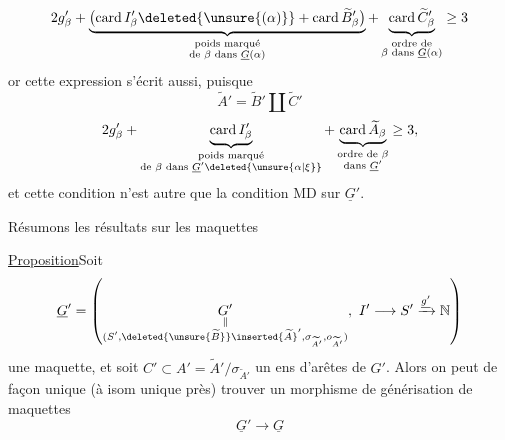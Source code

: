 \[
2g'_\beta+\underbrace{\bigl(\operatorname{card}I'_\beta\deleted{\unsure{(\alpha)}}+\operatorname{card}\widetilde B'_\beta\bigr)}_{\substack{\text{poids marqué}\\\text{de }\beta\text{ dans }\underline G(\alpha)}}+\underbrace{\operatorname{card}\widetilde C'_\beta}_{\substack{\text{ordre de}\\\beta\text{ dans }\underline G(\alpha)}}\geq3
\]
or cette expression s'écrit aussi, puisque
\[
\widetilde A'=\widetilde B'\amalg\widetilde C'
\]
\[
2g'_\beta+\underbrace{\operatorname{card}I'_\beta}_{\substack{\text{poids marqué}\\\text{de }\beta\text{ dans }\underline G'\deleted{\unsure{\alpha|\xi}}}}+\underbrace{\operatorname{card}\widetilde A_\beta}_{\substack{\text{ordre de }\beta\\\text{dans }\underline G'}}\geq3,
\]
et cette condition n'est autre que la condition  MD sur $\underline G'$.

Résumons les résultats sur les maquettes

\uline{Proposition}\quad Soit
\[
\underline G'=\left(\underset{\substack{\Vert\\(S',\deleted{\unsure{\widetilde B}}\inserted{\widetilde A}',\sigma_{\widetilde A'},o_{\widetilde A'})}}{G'},\ I'\longrightarrow S'\xrightarrow{\underline{g'}}\mathbb N\right)
\]
une maquette, et soit $C'\subset A'=\widetilde A'/\sigma_{\widetilde A'}$ un ens d'arêtes de $G'$. Alors on peut de façon unique  (à isom unique près) trouver un morphisme de générisation de maquettes
\[
\underline G'\longrightarrow\underline G
\]
